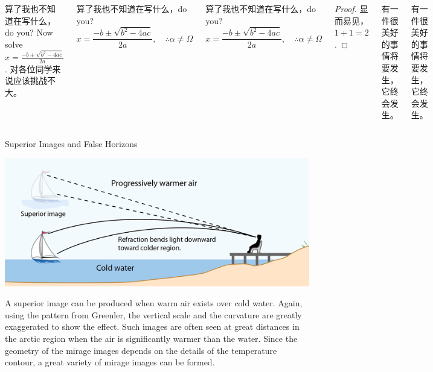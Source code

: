 \documentclass[linespread=1.4,t]{ctexbeamer}
\begin{document}
\begin{frame}
\begin{columns}[T]
\begin{exampleblock}{算了我也不知道在写什么，do you?}
Now solve $x = \frac{-b \pm \sqrt{b^2 -4ac}}{2a}$. 对各位同学来说应该挑战不大。
\end{exampleblock}

\begin{alertblock}{算了我也不知道在写什么，do you?}
\[ x = \frac{-b \pm \sqrt{b^2 -4ac}}{2a}, \quad\therefore \alpha \neq \Omega \]
\end{alertblock}

\begin{block}{算了我也不知道在写什么，do you?}
\[ x = \frac{-b \pm \sqrt{b^2 -4ac}}{2a}, \quad\therefore \alpha \neq \Omega \]
\end{block}

\begin{proof}
显而易见，$1+1=2$.
\end{proof}

\begin{theorem}
有一件很美好的事情将要发生，它终会发生。
\end{theorem}

\begin{definition}
有一件很美好的事情将要发生，它终会发生。
\end{definition}

\end{columns}

\begin{block}{Superior Images and False Horizons \citep{Mirage-Greenler1980,AtmRefrac-Hyperphysics}}
\begin{center}\includegraphics[width=0.95\hsize]{miragesup.png}\end{center}
\linespread{1}\selectfont
A superior image can be produced when warm air exists over cold water. Again, using the pattern from Greenler, the vertical scale and the curvature are greatly exaggerated to show the effect. Such images are often seen at great distances in the arctic region when the air is significantly warmer than the water. Since the geometry of the mirage images depends on the details of the temperature contour, a great variety of mirage images can be formed.


\end{block}
\end{frame}
\end{document}
